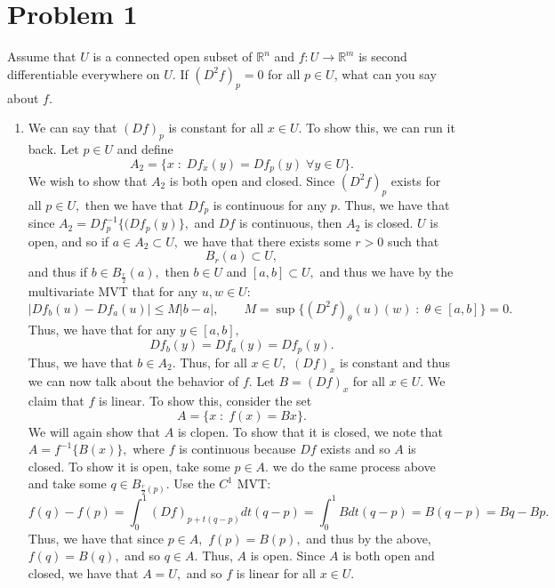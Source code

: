 \documentclass[11pt]{article}
\newcommand{\bbR}{\mathbb{R}}
\begin{document}
	
	
	\psetheader
\section*{Problem 1}
\begin{problem}
    Assume that $U$ is a connected open subset of $\bbR^n$ and $f : U \to \bbR^m$ is second differentiable everywhere on $U$. If $(D^2f)_p =0$ for all $p \in U$, what can you say about $f$.
\end{problem}
\begin{enumerate}
    \item 
\begin{solution}
    We can say that $(Df)_p$ is constant for all $x \in U.$ To show this, we can run it back. Let $p \in U$ and define
\[A_2 = \{x \; : \; Df_x(y) = Df_p(y) \; \forall y \in U\}.\] We wish to show that $A_2$ is both open and closed. Since $(D^2f)_p$ exists for all $p\in U,$ then we have that $Df_p$ is continuous for any $p.$ Thus, we have that since $A_2 = Df_p^{-1}\{(Df_p(y)\},$ and $Df$ is continuous, then $A_2$ is closed. $U$ is open, and so if $a \in A_2 \subset U,$ we have that there exists some $r>0$ such that 
\[B_{r}(a)\subset U,\] and thus if $b \in B_{\frac{r}{2}}(a),$ then $b \in U$ and $[a,b]\subset U,$ and thus we have by the multivariate MVT that for any $u,w \in U:$
\[|Df_b(u) - Df_a(u)| \leq M |b-a|, \qquad M = \sup\{(D^2f)_\theta(u)(w) \; : \; \theta \in [a,b]\} = 0.\]  Thus, we have that for any $y \in [a,b],$
\[Df_b(y) = Df_a(y) = Df_p(y).\] Thus, we have that $b \in A_2.$ Thus, for all $x\in U,$ $(Df)_x$ is constant and thus we can now talk about the behavior of $f.$ Let $B = (Df)_x$ for all $x\in U.$ We claim that $f$ is linear. To show this, consider the set
\[A = \{x \; : \; f(x) = Bx\}.\] We will again show that $A$ is clopen. To show that it is closed, we note that $A = f^{-1}\{B(x)\},$ where $f$ is continuous because $Df$ exists and so $A$ is closed. To show it is open, take some $p \in A.$ we do the same process above and take some $q \in B_{\frac{r}{2}(p)}.$ Use the $C^1$ MVT:
\[f(q) - f(p) = \int_0^1 (Df)_{p + t(q-p)}dt(q-p) = \int_0^1 B dt (q-p) = B(q-p) = Bq - Bp.\] Thus, we have that since $p \in A,$ $f(p) = B(p),$ and thus by the above, $f(q) = B(q),$ and so $q \in A.$ Thus, $A$ is open. Since $A$ is both open and closed, we have that $A = U,$ and so $f$ is linear for all $x \in U.$\\
\end{solution}

\end{enumerate}
\end{document}
